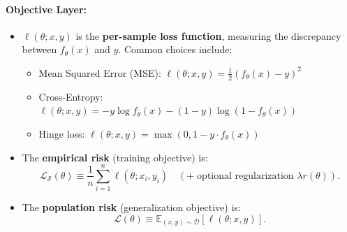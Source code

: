 \documentclass[
  journal=largetwo,
  year=2025,
  volume=37,
]{cup-journal}
\begin{document}
\begin{setting}
\paragraph{Objective Layer:}
\begin{itemize}
    \item $\ell(\theta; x,y)$ is the \textbf{per-sample loss function}, measuring the discrepancy between $f_\theta(x)$ and $y$. Common choices include:
    \begin{itemize}
        \item Mean Squared Error (MSE): $\ell(\theta; x,y) = \frac{1}{2}(f_\theta(x) - y)^2$
        \item Cross-Entropy: $\ell(\theta; x,y) = -y\log f_\theta(x) - (1-y)\log(1-f_\theta(x))$
        \item Hinge loss: $\ell(\theta; x,y) = \max(0, 1 - y \cdot f_\theta(x))$
    \end{itemize}
    \item The \textbf{empirical risk} (training objective) is:
    \begin{equation}
        \mathcal{L}_{\mathcal{S}}(\theta) \equiv \frac{1}{n}\sum_{i=1}^n \ell(\theta; x_i,y_i)\quad (+\;\text{optional regularization } \lambda r(\theta)).
    \end{equation}
    \item The \textbf{population risk} (generalization objective) is:
    \begin{equation}
        \mathcal{L}(\theta)\equiv\mathbb{E}_{(x,y)\sim\mathcal{D}}[\ell(\theta;x,y)].
    \end{equation}
\end{itemize}


\end{setting}
\end{document}

